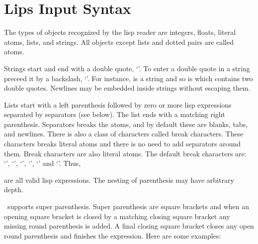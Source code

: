 \section{Lips Input Syntax}
The types of objects recognized by the lisp reader are integers,
floats, literal atoms, lists, and strings.  All objects except lists
and dotted pairs are called atoms.

Strings start and end with a double quote, `'.  To enter a
double quote in a string preceed it by a backslash, `'.
For instance,  is a string and so is  which contains two double quotes.  Newlines
may be embedded inside strings without escaping them.

Lists start with a left parenthesis followed by zero or more lisp
expressions separated by separators (see below).  The list ends with a
matching right parenthesis.  Separators breaks the atoms, and by
default these are blanks, tabs, and newlines.  There is also a class
of characters called break characters.  These characters breaks
literal atoms and there is no need to add separators around them.
Break characters are also literal atoms.  The default break characters
are: `\lisp{(}', `\lisp{)}', `\lisp{\&}', `\lisp{<}', `\lisp{>}' and
`\lisp{|}'.  Thus,

\begin{quote}
\end{quote}

are all valid lisp expressions.  The nesting of parenthesis may have
arbitrary depth.

\lips\ supports super parenthesis. Super parenthesis are square
brackets and when an opening square bracket is closed by a matching
closing square bracket any missing round parenthesis is added. A final
closing square bracket closes any open round parenthesis and finishes
the expression. Here are some examples:

\begin{examples}
  \ex{(cons 'a (cons 'b (cons 'c]}{(a b c)}
\end{examples}

